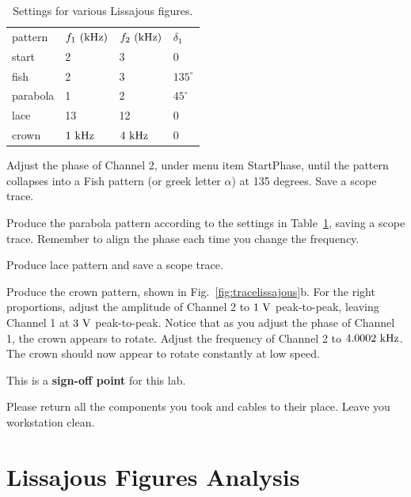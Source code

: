 \begin{table}
\begin{center}
\caption{Settings for various Lissajous figures.}
\label{tbl:lissajous}
\begin{tabular}{llll}
pattern & $f_1~\rm(kHz)$ & $f_2~\rm(kHz)$ & $\delta_1$ \\
start & 2 & 3 & 0 \\
fish & 2 & 3 & $135^\circ$ \\
parabola & 1 & 2 & $45^\circ$ \\
lace & 13 & 12 & 0 \\
crown & $1~\rm kHz$ & $4~\rm kHz$ & 0 \\
\end{tabular}
\end{center}
\end{table}

\begin{plot}
Adjust the phase of Channel 2, under menu item StartPhase, until the
pattern collapses into a Fish pattern (or greek letter $\alpha$) at
135 degrees.  Save a scope trace.
\end{plot}

\begin{plot}
Produce the parabola pattern according to the settings in
Table~\ref{tbl:lissajous}, saving a scope trace.  Remember to align
the phase each time you change the frequency.
\end{plot}

\begin{plot}
Produce lace pattern and save a scope trace.
\end{plot}

\begin{plot}
Produce the crown pattern, shown in Fig.~\ref{fig:tracelissajous}b.
For the right proportions, adjust the amplitude of Channel 2 to $1~\rm
V$ peak-to-peak, leaving Channel 1 at $3~\rm V$ peak-to-peak.  Notice
that as you adjust the phase of Channel 1, the crown appears to
rotate.  Adjust the frequency of Channel 2 to $4.0002~\rm kHz$.  The
crown should now appear to rotate constantly at low speed.
\end{plot}

This is a \textbf{sign-off point} for this lab. 

Please return all the components you took and cables to their
place. Leave you workstation clean.

\section{Lissajous Figures Analysis}

